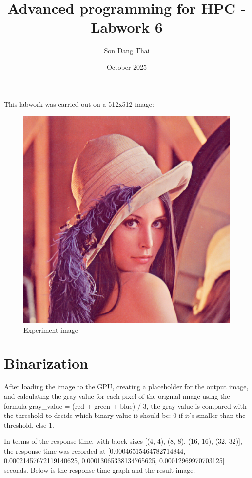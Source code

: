 \documentclass{article}
\title{Advanced programming for HPC - Labwork 6}
\author{Son Dang Thai}
\date{October 2025}
\begin{document}
\maketitle

This labwork was carried out on a 512x512 image:

\begin{figure}[htbp]
    \centering
    \includegraphics[width=1\linewidth]{lenna.png}
    \caption{Experiment image}
    \label{fig:Experiment image}
\end{figure}

\section{Binarization}

After loading the image to the GPU, creating a placeholder for the output image, and calculating the gray value for each pixel of the original image using the formula gray\_value = (red + green + blue) / 3, the gray value is compared with the threshold to decide which binary value it should be: 0 if it's smaller than the threshold, else 1.

In terms of the response time, with block sizes [(4, 4), (8, 8), (16, 16), (32, 32)], the response time was recorded at [0.00046515464782714844, 0.00021457672119140625, 0.00013065338134765625, 0.00012969970703125] seconds. Below is the response time graph and the result image:
\end{document}
